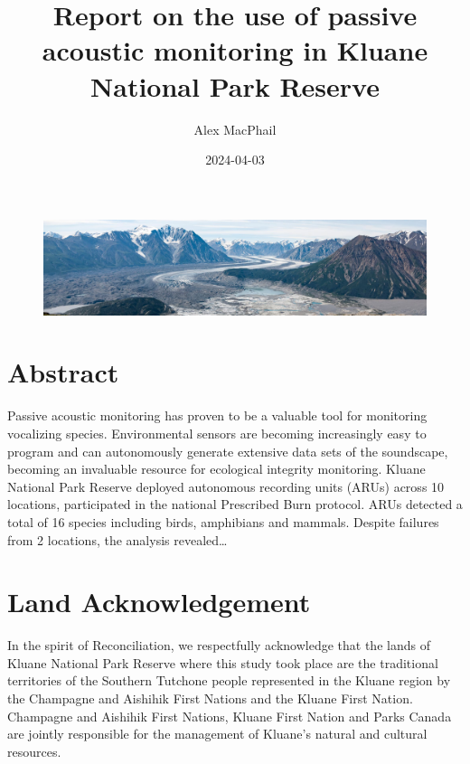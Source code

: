\documentclass[
  letterpaper,
  DIV=11,
  numbers=noendperiod,
  oneside]{scrartcl}
\title{Report on the use of passive acoustic monitoring in Kluane
National Park Reserve}
\author{Alex MacPhail}
\date{2024-04-03}
\renewcommand*\contentsname{Table of contents}
\newcommand\contentsname{Table of contents}
\begin{document}
\maketitle
\ifdefined\Shaded\renewenvironment{Shaded}{\begin{tcolorbox}[breakable, enhanced, borderline west={3pt}{0pt}{shadecolor}, interior hidden, boxrule=0pt, frame hidden, sharp corners]}{\end{tcolorbox}}\fi

\renewcommand*\contentsname{Table of contents}
{
\hypersetup{linkcolor=}
\setcounter{tocdepth}{3}
\tableofcontents
}
\begin{figure}

{\centering \includegraphics{kluane-banner.jpg}

}

\end{figure}

\hypertarget{abstract}{%
\section{Abstract}\label{abstract}}

Passive acoustic monitoring has proven to be a valuable tool for
monitoring vocalizing species. Environmental sensors are becoming
increasingly easy to program and can autonomously generate extensive
data sets of the soundscape, becoming an invaluable resource for
ecological integrity monitoring. Kluane National Park Reserve deployed
autonomous recording units (ARUs) across 10 locations, participated in
the national Prescribed Burn protocol. ARUs detected a total of 16
species including birds, amphibians and mammals. Despite failures from 2
locations, the analysis revealed\ldots{}

\hypertarget{land-acknowledgement}{%
\section{Land Acknowledgement}\label{land-acknowledgement}}

In the spirit of Reconciliation, we respectfully acknowledge that the
lands of Kluane National Park Reserve where this study took place are
the traditional territories of the Southern Tutchone people represented
in the Kluane region by the Champagne and Aishihik First Nations and the
Kluane First Nation. Champagne and Aishihik First Nations, Kluane First
Nation and Parks Canada are jointly responsible for the management of
Kluane's natural and cultural resources.
\end{document}
